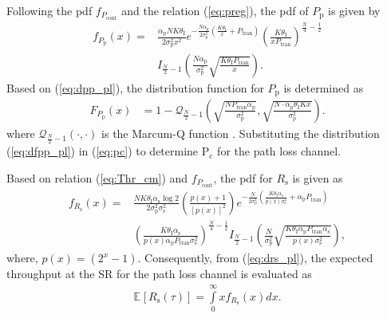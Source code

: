 \documentclass[conference, twocolumn]{IEEEtran}
\newcommand{\e}[2]{{\mathbb E}_{#1}\left[ #2 \right]}
\newcommand{\q}[2]{{\mathcal Q}_{#1}\left( #2 \right)}
\newcommand{\sub}[1]{_{\text{#1}}}
\newcommand{\pc}{\text{P}\sub{c}}
\newcommand{\preg}{P\sub{cont}}
\newcommand{\ptran}{P\sub{tran}}
\newcommand{\pp}{P\sub{p}}
\newcommand{\ite}{\theta\sub{I}}
\newcommand{\rs}{R\sub{s}}
\newcommand{\ap}{\alpha\sub{p}}
\newcommand{\as}{\alpha\sub{s}}
\newcommand{\npp}{\sigma^2\sub{p}}
\newcommand{\nps}{\sigma^2\sub{s}}
\newcommand{\fpp}{F_{\pp}}
\newcommand{\frs}{F_{\rs}}
\newcommand{\dpp}{f_{\pp}}
\newcommand{\dpreg}{f_{\preg}}
\newcommand{\drs}{f_{\rs}}
\begin{document}
Following the pdf $\dpreg$ and the relation (\ref{eq:preg}), the pdf of $\pp$ is given by
\begin{align}
\dpp(x) =& \frac{\ap N K \ite}{2\npp x^2} e^{- \frac{N \ap}{2 \npp}\left( \frac{K  \ite}{x} + \ptran \right)} \left( \frac{K \ite}{x \ptran}   \right)^{\frac{N}{4} - \frac{1}{2}} \label{eq:dpp_pl} \\
\quad & I_{\frac{N}{2}  - 1}\left( \frac{N \ap}{\npp} \sqrt{\frac{ K \ite \ptran}{x}}  \right). \nonumber
\end{align}
Based on (\ref{eq:dpp_pl}), the distribution function for $\pp$ is determined as 
\begin{align}
\fpp(x) &= 1 - \q{\frac{N}{2} - 1}{\sqrt{\frac{N \ptran \ap}{\npp}},\sqrt{\frac{N \cdot \ap \ite K x}{\npp}} }.  
\label{eq:dfpp_pl}
\end{align}
where $\q{\frac{N}{2} - 1}{\cdot, \cdot}$ is the Marcum-Q function \cite{grad}.
Substituting the distribution (\ref{eq:dfpp_pl}) in (\ref{eq:pc}) to determine $\pc$ for the path loss channel. 

Based on relation (\ref{eq:Thr_cm}) and $\dpreg$, the pdf for $\rs$ is given as  
\begin{align}
\drs(x) =& \frac{N K \ite \as \log2} {2\npp \nps} \left( \frac{p(x) + 1}{[p(x)]^2}\right) e^{- \frac{N}{2 \npp}\left( \frac{K  \ite \as}{p(x) \nps} + \ap \ptran \right)} \label{eq:drs_pl} \\
\quad & \left( \frac{K \ite \as}{p(x) \ap \ptran \nps}   \right)^{\frac{N}{4} - \frac{1}{2}}  I_{\frac{N}{2}  - 1}\left( \frac{N}{\npp} \sqrt{\frac{ K \ite \ap \ptran \as}{p(x) \nps}}  \right), \nonumber 
\end{align}
where, $p(x) = (2^x - 1)$.   
Consequently, from (\ref{eq:drs_pl}), the expected throughput at the SR for the path loss channel is evaluated as 
\begin{align}
\e{}{\rs(\tau)} = \int\limits_{0}^{\infty} x \drs(x) dx. 
\label{eq:ers_pl}
\end{align}
\end{document}
